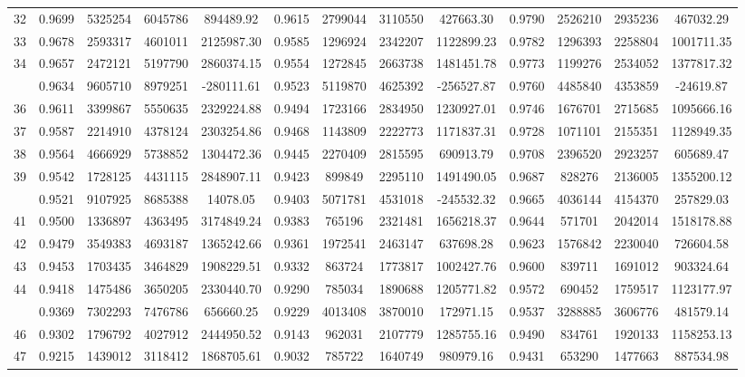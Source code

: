 \documentclass[
  12pt,
]{article}
\begin{document}
\begin{longtable}[t]{lcccccccccccc}
32 & 0.9699 & 5325254 & 6045786 & 894489.92 & 0.9615 & 2799044 & 3110550 & 427663.30 & 0.9790 & 2526210 & 2935236 & 467032.29\\
33 & 0.9678 & 2593317 & 4601011 & 2125987.30 & 0.9585 & 1296924 & 2342207 & 1122899.23 & 0.9782 & 1296393 & 2258804 & 1001711.35\\
34 & 0.9657 & 2472121 & 5197790 & 2860374.15 & 0.9554 & 1272845 & 2663738 & 1481451.78 & 0.9773 & 1199276 & 2534052 & 1377817.32\\
\addlinespace
35 & 0.9634 & 9605710 & 8979251 & -280111.61 & 0.9523 & 5119870 & 4625392 & -256527.87 & 0.9760 & 4485840 & 4353859 & -24619.87\\
36 & 0.9611 & 3399867 & 5550635 & 2329224.88 & 0.9494 & 1723166 & 2834950 & 1230927.01 & 0.9746 & 1676701 & 2715685 & 1095666.16\\
37 & 0.9587 & 2214910 & 4378124 & 2303254.86 & 0.9468 & 1143809 & 2222773 & 1171837.31 & 0.9728 & 1071101 & 2155351 & 1128949.35\\
38 & 0.9564 & 4666929 & 5738852 & 1304472.36 & 0.9445 & 2270409 & 2815595 & 690913.79 & 0.9708 & 2396520 & 2923257 & 605689.47\\
39 & 0.9542 & 1728125 & 4431115 & 2848907.11 & 0.9423 & 899849 & 2295110 & 1491490.05 & 0.9687 & 828276 & 2136005 & 1355200.12\\
\addlinespace
40 & 0.9521 & 9107925 & 8685388 & 14078.05 & 0.9403 & 5071781 & 4531018 & -245532.32 & 0.9665 & 4036144 & 4154370 & 257829.03\\
41 & 0.9500 & 1336897 & 4363495 & 3174849.24 & 0.9383 & 765196 & 2321481 & 1656218.37 & 0.9644 & 571701 & 2042014 & 1518178.88\\
42 & 0.9479 & 3549383 & 4693187 & 1365242.66 & 0.9361 & 1972541 & 2463147 & 637698.28 & 0.9623 & 1576842 & 2230040 & 726604.58\\
43 & 0.9453 & 1703435 & 3464829 & 1908229.51 & 0.9332 & 863724 & 1773817 & 1002427.76 & 0.9600 & 839711 & 1691012 & 903324.64\\
44 & 0.9418 & 1475486 & 3650205 & 2330440.70 & 0.9290 & 785034 & 1890688 & 1205771.82 & 0.9572 & 690452 & 1759517 & 1123177.97\\
\addlinespace
45 & 0.9369 & 7302293 & 7476786 & 656660.25 & 0.9229 & 4013408 & 3870010 & 172971.15 & 0.9537 & 3288885 & 3606776 & 481579.14\\
46 & 0.9302 & 1796792 & 4027912 & 2444950.52 & 0.9143 & 962031 & 2107779 & 1285755.16 & 0.9490 & 834761 & 1920133 & 1158253.13\\
47 & 0.9215 & 1439012 & 3118412 & 1868705.61 & 0.9032 & 785722 & 1640749 & 980979.16 & 0.9431 & 653290 & 1477663 & 887534.98\\

\end{longtable}
\end{document}
